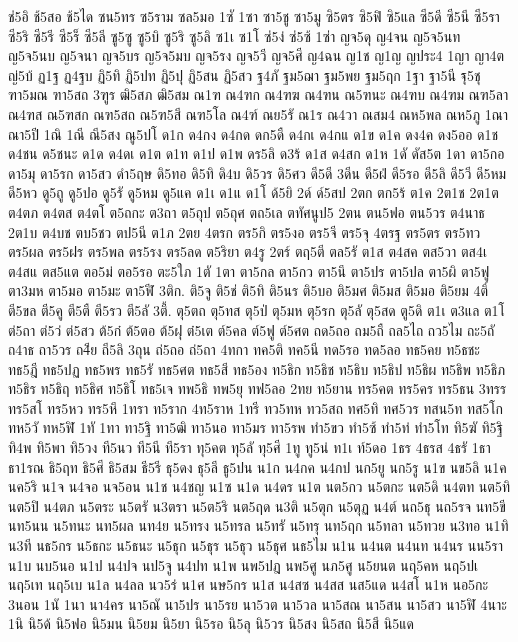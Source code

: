 {ช่5อิ
ช้5สอ
ช้5ได
ซน5ทร
ซ5ราม
ซล5มอ
1ซั
1ซา
ซา5ชู
ซา5มู
ซิ5ตร
ซิ5ฟิ
ซิ5แล
ซี5ดี
ซี5นี
ซี5รา
ซี5ริ
ซี5รี
ซี5ร็
ซี5ลี
ซู5ซู
ซู5บิ
ซู5ริ
ซู5ลิ
ซ1เ
ซ1โ
ซ่5ง่
ซ่5ซ้
1ซ่า
ญจ5ดุ
ญ4จน
ญ5จ5นท
ญ5จ5นบ
ญ5จนา
ญจ5บร
ญ5จ5มบ
ญจ5รง
ญจ5วี
ญจ5ศี
ญ4ฉน
ญ1ช
ญ1ญ
ญประ4
1ญา
ญา4ต
ญ่5บ้
ฏ1ฐ
ฏ4ฐบ
ฏิ5ทิ
ฏิ5ปท
ฏิ5ปุ
ฏิ5สน
ฏิ5สว
ฐ4ภั
ฐม5ฌา
ฐม5พย
ฐม5ฤก
1ฐา
ฐา5นี
ฐุ5ชุ
ฑา5มณ
ฑา5สถ
3ฑูร
ฒิ5สภ
ฒิ5สม
ณ1ฑ
ณ4ฑก
ณ4ฑฆ
ณ4ฑน
ณ5ฑนะ
ณ4ฑบ
ณ4ฑม
ณฑ5ลา
ณ4ฑส
ณ5ฑสก
ณฑ5สถ
ณ5ฑ5สี
ณฑ5โล
ณ4ฑ์
ณย5รั
ณ1ร
ณ4วา
ณสม4
ณห5พล
ณห5ภู
1ณา
ณา5ปี
1ณิ
1ณี
ณี5สง
ณู5ปโ
ด1ก
ด4กง
ด4กด
ดก5ดื
ด4กเ
ด4กแ
ด1ข
ด1ค
ดง4ค
ดง5ออ
ด1ช
ด4ชน
ด5ชนะ
ด1ด
ด4ดเ
ด1ต
ด1ท
ด1ป
ด1พ
ดร5ลิ
ด3ร้
ด1ส
ด4สก
ด1ห
1ดั
ดัส5ต
1ดา
ดา5กอ
ดา5มุ
ดา5รก
ดา5สว
ดำ5ฤษ
ดิ5ทอ
ดิ5ทิ
ดิ4บ
ดิ5วร
ดิ5ศว
ดี5ดี
3ดีน
ดี5ฝ่
ดี5รอ
ดี5ลิ
ดี5วี
ดี5หม
ดี5หว
ดู5ถู
ดู5ปอ
ดู5รั
ดู5หม
ดู5แค
ด1เ
ด1แ
ด1โ
ด้5ยิ
2ด์
ด์5สป
2ตก
ตก5ร้
ต1ค
2ต1ช
2ต1ต
ต4ตภ
ต4ตส
ต4ตโ
ต5ถกะ
ต3ถา
ต5ถุป
ต5ถุศ
ตถ5เล
ตทัศนูป5
2ตน
ตน5ฟอ
ตน5วร
ต4นาธ
2ต1บ
ต4บช
ตบ5ชว
ตป5นี
ต1ภ
2ตย
4ตรก
ตร5กิ
ตร5งอ
ตร5จี
ตร5จุ
4ตรฐ
ตร5ตร
ตร5ทว
ตร5ผล
ตร5ฝร
ตร5พล
ตร5รง
ตร5ลด
ต5ริยา
ต4รู
2ตร์
ตฤ5ตี
ตล5รั
ต1ส
ต4สค
ตส5วา
ตส4เ
ต4สแ
ตส5แต
ตอ5ม่
ตอ5รอ
ตะ5ใภ
1ตั
1ตา
ตา5กล
ตา5กว
ตา5นึ
ตา5ปร
ตา5ปล
ตา5ผิ
ตา5ฟู
ตา3มห
ตา5มอ
ตา5มะ
ตา5ฬี
3ติก.
ติ5จู
ติ5ช่
ติ5ทิ
ติ5นร
ติ5บอ
ติ5มศ
ติ5มส
ติ5มอ
ติ5ยม
4ติ์
ตี5ขล
ตี5คู
ตี5ตื
ตี5รว
ตี5ลั
3ตี้.
ตุ5ตถ
ตุ5ทส
ตุ5ป่
ตุ5มห
ตุ5รก
ตุ5ลั
ตุ5สด
ตู5ดิ
ต1เ
ต3แล
ต1โ
ต่5ถา
ต่5ว่
ต่5สว
ต้5ก๋
ต้5ตอ
ต้5ฝุ
ต๋5เต
ต์5คล
ต์5ฟู
ต์5ศต
ถด5ถอ
ถม5ถื
ถล5ไถ
ถว5ไม
ถะ5ถั
ถ4าธ
ถา5วร
ถ4ีย
ถี5ลิ
3ถุน
ถ่5ถอ
ถ่5ถา
4ทกา
ทค5ติ
ทค5นี
ทด5รอ
ทด5ลอ
ทธ5คย
ท5ธชะ
ทธ5ฎี
ทธ5ปฏ
ทธ5พร
ทธ5รั
ทธ5ศต
ทธ5สี
ทธ5อง
ท5ธิก
ท5ธิช
ท5ธิบ
ท5ธิป
ท5ธิผ
ท5ธิพ
ท5ธิภ
ท5ธิร
ท5ธิฤ
ท5ธิศ
ท5ธิโ
ทธ5เจ
ทพ5ธิ
ทพ5ยุ
ทฟ5ลอ
2ทย
ท5ยาน
ทร5คต
ทร5คร
ทร5ธน
3ทรร
ทร5สโ
ทร5หว
ทร5หึ
1ทรา
ท5ราก
4ท5ราห
1ทรี
ทว5ทห
ทว5สถ
ทศ5ทิ
ทศ5วร
ทสน5ท
ทส5โก
ทห5วั
ทห5ฬิ
1ทั
1ทา
ทา5ฐิ
ทา5ฒิ
ทา5นอ
ทา5มร
ทา5รพ
ทำ5ขว
ทำ5ซ้
ทำ5ท่
ทำ5โท
ทิ5ฆั
ทิ5ฐิ
ทิ4พ
ทิ5พา
ทิ5วง
ที5นว
ที5นี
ที5รา
ทุ5คต
ทุ5ลั
ทุ5ศี
1ทู
ทู5น่
ท1เ
ท์5ดอ
1ธร
4ธรส
4ธรั
1ธา
ธา1รณ
ธิ5ฤท
ธิ5ศี
ธิ5สม
ธี5รี
ธุ5ดง
ธุ5ลี
ธู5ปน
น1ก
น4กค
น4กป
นก5ยู
นก5รู
น1ข
นข5ลิ
น1ค
นค5ริ
น1จ
น4จอ
นจ5อน
น1ช
น4ชญ
น1ซ
น1ด
น4ดร
น1ต
นต5กว
น5ตกะ
นต5ดิ
น4ตท
นต5ทิ
นต5ปิ
น4ตภ
น5ตระ
น5ตรั
น3ตรา
น5ต5ริ
นต5ฤด
น3ติ
น5ตุก
น5ตุฏ
น4ต์
นถ5ธุ
นถ5รจ
นท5ขี
นท5นน
น5ทนะ
นท5ผล
นท4ย
น5ทรง
น5ทรล
น5ทรั
น5ทรุ
นท5ฤก
น5ทลา
น5ทวย
น3ทอ
น1ทิ
น3ที
นธ5กร
น5ธกะ
น5ธนะ
น5ธุก
น5ธุร
น5ธุว
น5ธุศ
นธ5ไม
น1น
น4นต
น4นท
น4นร
นน5รา
น1บ
นบ5นอ
น1ป
น4ปจ
นป5จู
น4ปท
น1พ
นพ5ปฎ
นพ5ศู
นภ5ศู
น5ยนต
นฤ5คห
นฤ5ปเ
นฤ5เท
นฤ5เบ
น1ล
น4ลล
นว5ร่
น1ศ
นษ5กร
น1ส
น4สซ
น4สส
นส5แด
น4สโ
น1ห
นอ5กะ
3นอน
1นั
1นา
นา4คร
นา5ณั
นา5ปร
นา5รย
นา5วต
นา5วล
นา5สณ
นา5สน
นา5สว
นา5ฬิ
4นาะ
1นิ
นิ5ด้
นิ5ฟอ
นิ5มน
นิ5ยม
นิ5ยา
นิ5รอ
นิ5ลุ
นิ5วร
นิ5สง
นิ5สถ
นิ5สี
นิ5แด
}
